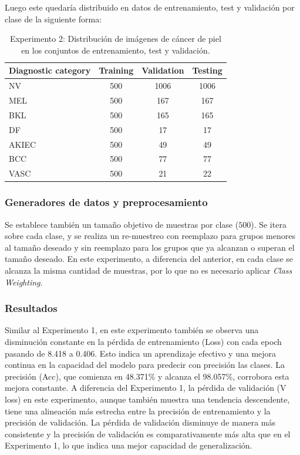 Luego este quedaría distribuido en datos de entrenamiento, test y  validación por clase de la siguiente forma:
   \begin{table}[H]
      \centering
      \begin{tabular}{lccc}
      \hline
      \textbf{Diagnostic category} & \textbf{Training} & \textbf{Validation} & \textbf{Testing} \\
      \hline
      NV    & 500 & 1006 & 1006 \\
      MEL   & 500 & 167  & 167  \\
      BKL   & 500 & 165  & 165  \\
      DF    & 500 & 17   & 17   \\
      AKIEC & 500 & 49   & 49   \\
      BCC   & 500 & 77   & 77   \\
      VASC  & 500 & 21   & 22   \\
      \hline
      \end{tabular}
      \caption{Experimento 2: Distribución de imágenes de cáncer de piel en los conjuntos de entrenamiento, test y validación.}
      \label{tab:train_test_validate_e2}
      \end{table}
 
\subsubsection*{Generadores de datos y preprocesamiento}

Se establece también un tamaño objetivo de muestras por clase ($500$). Se itera sobre cada clase, y se realiza un re-muestreo con reemplazo para grupos menores al tamaño deseado y sin reemplazo para los grupos que ya alcanzan o superan el tamaño deseado. 
En este experimento, a diferencia del anterior, en cada clase se alcanza la misma cantidad de muestras, por lo que no es necesario aplicar \textit{Class Weighting}.

\subsubsection*{Resultados}

 Similar al Experimento 1, en este experimento también se observa una disminución constante en la pérdida de entrenamiento (Loss) con cada epoch pasando de 8.418 a 0.406. Esto indica un aprendizaje efectivo y una mejora continua en la capacidad del modelo para predecir con precisión las clases. La precisión (Acc), que comienza en 48.371\% y alcanza el 98.057\%, corrobora esta mejora constante. A diferencia del Experimento 1, la pérdida de validación (V loss) en este experimento, aunque también muestra una tendencia descendente, tiene una alineación más estrecha entre la precisión de entrenamiento y la precisión de validación. La pérdida de validación disminuye de manera más consistente y la precisión de validación es comparativamente más alta que en el Experimento 1, lo que indica una mejor capacidad de generalización.
    

